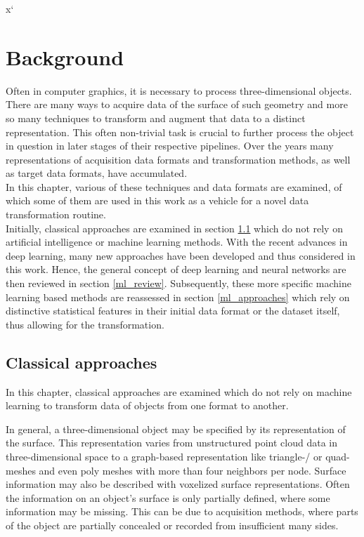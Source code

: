 x`\chapter{Background}
\label{sec:background}
Often in computer graphics, it is necessary to process three-dimensional objects. There are many ways to acquire data of the surface of such geometry and more so many techniques to transform and augment that data to a distinct representation. This often non-trivial task is crucial to further process the object in question in later stages of their respective pipelines. Over the years many representations of acquisition data formats and transformation methods, as well as target data formats, have accumulated.\\
In this chapter, various of these techniques and data formats are examined, of which some of them are used in this work as a vehicle for a novel data transformation routine.\\
Initially, classical approaches are examined in section \ref{classic_approaches} which do not rely on artificial intelligence or machine learning methods.
With the recent advances in deep learning, many new approaches have been developed and thus considered in this work. Hence, the general concept of deep learning and neural networks are then reviewed in section \ref{ml_review}.
Subsequently, these more specific machine learning based methods are reassessed in section \ref{ml_approaches} which rely on distinctive statistical features in their initial data format or the dataset itself, thus allowing for the transformation.
\section{Classical approaches}
\label{classic_approaches}
In this chapter, classical approaches are examined which do not rely on machine
 learning to transform data of objects from one format to another. 

In general, a three-dimensional object may be specified by its representation of the
 surface. This representation varies from unstructured point cloud data in three-dimensional space
  to a graph-based representation like triangle-/ or quad-meshes and even poly meshes
   with more than four neighbors per node. Surface information may also be described
    with voxelized surface representations.  Often the information on an object's
     surface is only partially defined, where some information may be missing. 
     This can be due to acquisition methods, where parts of the object are partially 
     concealed or recorded from insufficient many sides.



